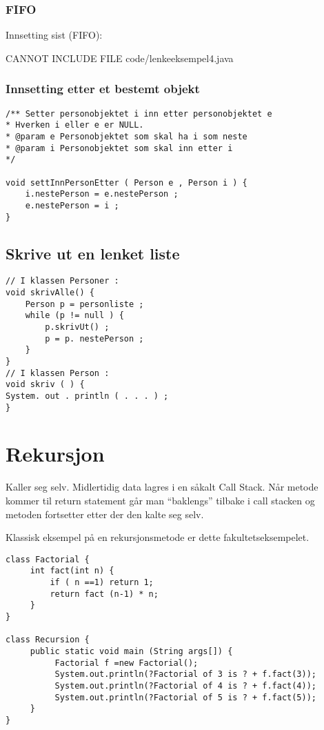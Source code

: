 \documentclass[11pt]{article}
\begin{document}
\subsubsection{FIFO}
\label{sec-8_2_2}

Innsetting sist (FIFO):

CANNOT INCLUDE FILE code/lenkeeksempel4.java
\subsubsection{Innsetting etter et bestemt objekt}
\label{sec-8_2_3}


\begin{verbatim}
/** Setter personobjektet i inn etter personobjektet e
* Hverken i eller e er NULL.
* @param e Personobjektet som skal ha i som neste
* @param i Personobjektet som skal inn etter i
*/

void settInnPersonEtter ( Person e , Person i ) {
    i.nestePerson = e.nestePerson ;
    e.nestePerson = i ;
}
\end{verbatim}
\subsection{Skrive ut en lenket liste}
\label{sec-8_3}


\begin{verbatim}
// I klassen Personer :
void skrivAlle() {
    Person p = personliste ;
    while (p != null ) {
        p.skrivUt() ;
        p = p. nestePerson ;
    }
}
// I klassen Person :
void skriv ( ) {
System. out . println ( . . . ) ;
}
\end{verbatim}
\section{Rekursjon}
\label{sec-9}


Kaller seg selv.
Midlertidig data lagres i en såkalt Call Stack. Når metode kommer til
return statement går man ``baklengs'' tilbake i call stacken og metoden
fortsetter etter der den kalte seg selv.

Klassisk eksempel på en rekursjonsmetode er dette fakultetseksempelet.

\begin{verbatim}
class Factorial {
     int fact(int n) {
         if ( n ==1) return 1;
         return fact (n-1) * n;
     }
}

class Recursion {
     public static void main (String args[]) {
          Factorial f =new Factorial();
          System.out.println(?Factorial of 3 is ? + f.fact(3));
          System.out.println(?Factorial of 4 is ? + f.fact(4));
          System.out.println(?Factorial of 5 is ? + f.fact(5));
     }
}
\end{verbatim}
\end{document}
